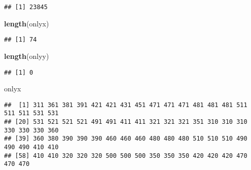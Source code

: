 \documentclass[
]{article}
\newenvironment{Shaded}{\begin{snugshade}}{\end{snugshade}}
\newcommand{\CommentTok}[1]{\textcolor[rgb]{0.56,0.35,0.01}{\textit{#1}}}
\newcommand{\KeywordTok}[1]{\textcolor[rgb]{0.13,0.29,0.53}{\textbf{#1}}}
\newcommand{\NormalTok}[1]{#1}
\newcommand{\OperatorTok}[1]{\textcolor[rgb]{0.81,0.36,0.00}{\textbf{#1}}}
\newcommand{\StringTok}[1]{\textcolor[rgb]{0.31,0.60,0.02}{#1}}
\begin{document}
\begin{Shaded}
\end{Shaded}

\begin{verbatim}
## [1] 23845
\end{verbatim}

\begin{Shaded}
\begin{Highlighting}[]
\KeywordTok{length}\NormalTok{(onlyx)}
\end{Highlighting}
\end{Shaded}

\begin{verbatim}
## [1] 74
\end{verbatim}

\begin{Shaded}
\begin{Highlighting}[]
\KeywordTok{length}\NormalTok{(onlyy)}
\end{Highlighting}
\end{Shaded}

\begin{verbatim}
## [1] 0
\end{verbatim}

\begin{Shaded}
\begin{Highlighting}[]
\NormalTok{onlyx}
\end{Highlighting}
\end{Shaded}

\begin{verbatim}
##  [1] 311 361 381 391 421 421 431 451 471 471 471 481 481 481 511 511 511 531 531
## [20] 531 521 521 521 491 491 411 411 321 321 321 351 310 310 310 330 330 330 360
## [39] 360 380 390 390 390 460 460 460 480 480 480 510 510 510 490 490 490 410 410
## [58] 410 410 320 320 320 500 500 500 350 350 350 420 420 420 470 470 470
\end{verbatim}
\end{document}

